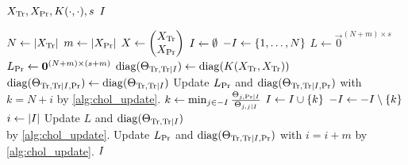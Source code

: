 \begin{algorithmic}[1]
  \REQUIRE \( X_{\text{Tr}}, X_{\text{Pr}}, K(\cdot, \cdot), s \)
  \ENSURE \( I \)

  \STATE \( N \gets \lvert X_{\text{Tr}}\rvert \)
  \STATE \( m \gets \lvert X_{\text{Pr}}\rvert \)
  \STATE \(
    X \gets
    \begin{pmatrix}
      X_{\text{Tr}} \\
      X_{\text{Pr}}
    \end{pmatrix}
  \)
  \STATE \( I \gets \emptyset \)
  \STATE \( -I \gets \{ 1, \dotsc, N \} \)
  \STATE \( L \gets \vec{0}^{(N + m) \times s} \)
  \STATE \( L_{\text{Pr}} \gets \bm{0}^{(N + m) \times (s + m)} \)
  \STATE \(
    \operatorname{diag}(\Theta_{\text{Tr}, \text{Tr} \mid I}) \gets
    \operatorname{diag}(K(X_{\text{Tr}}, X_{\text{Tr}}))
  \)
  \STATE \(
    \operatorname{diag}(\Theta_{\text{Tr}, \text{Tr} \mid I, \text{Pr}}) \gets
    \operatorname{diag}(\Theta_{\text{Tr}, \text{Tr} \mid I})
  \)
    \STATE Update \( L_{\text{Pr}} \) and \( \operatorname{diag}(\Theta_{\text{Tr}, \text{Tr}
      \mid I, \text{Pr}}) \) with \( k = N + i \) by \cref{alg:chol_update}.
  \ENDFOR
    \STATE \(
      k \gets \min_{j \in -I}
      \frac{\Theta_{j, \text{Pr} \mid I}}{\Theta_{j, j \mid I}}
    \)
    \STATE \( I \gets I \cup \{ k \} \)
    \STATE \( -I \gets -I \setminus \{ k \} \)
    \STATE \( i \gets \lvert I\rvert \)
    \STATE Update \( L \) and \( \operatorname{diag}(\Theta_{\text{Tr}, \text{Tr}
      \mid I}) \) \\ by \cref{alg:chol_update}.
    \STATE Update \( L_{\text{Pr}} \) and \( \operatorname{diag}(\Theta_{\text{Tr}, \text{Tr}
      \mid I, \text{Pr}}) \) with \( i = i + m \) by \cref{alg:chol_update}.
  \ENDWHILE
  \RETURN \( I \)
\end{algorithmic}
